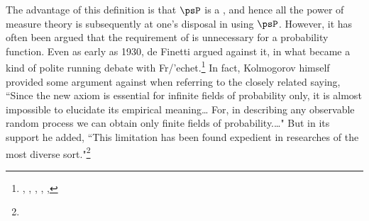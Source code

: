 \begin{remark}
The advantage of this definition is that $\psP$ is a , and hence all the power of measure theory 
is subsequently at one's disposal in using $\psP$.
However, it has often been argued that the requirement of  is unnecessary for a probability function.
Even as early as 1930, de Finetti argued against it, in what became a kind of polite running debate with Fr/'echet.\footnote{
  ,
  ,
  ,
  ,
  ,
  }
In fact, Kolmogorov himself provided some argument against  when referring to the closely related 
 saying,
``Since the new axiom is essential for infinite fields of probability only,
it is almost impossible to elucidate its empirical meaning\ldots
For, in describing any observable random process we can obtain only finite fields of probability.\ldots"
But in its support he added, ``This limitation has been found expedient in researches of the most diverse sort."\footnote{
  }


\end{remark}
